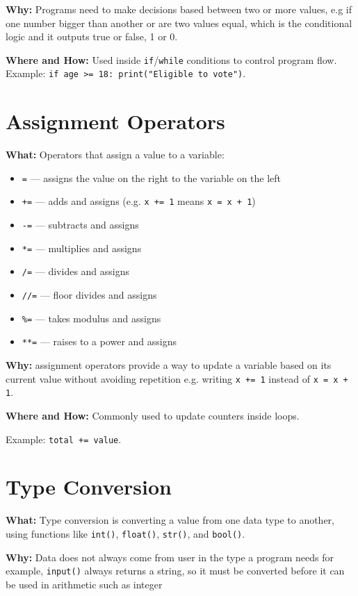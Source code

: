 \documentclass[11pt]{article}
\begin{document}
\textbf{Why:} Programs need to make decisions based between two or more values, e.g if 
one number bigger than another or are two values equal, which is the conditional logic and it outputs true or false, 1 or 0.

\textbf{Where and How:} Used inside \texttt{if}/\texttt{while} conditions to control program
flow.
Example: \texttt{if age >= 18: print("Eligible to vote")}.

\section{Assignment Operators}
\textbf{What:} Operators that assign a value to a variable:
\begin{itemize}[leftmargin=2em]
    \item \texttt{=} — assigns the value on the right to the variable on the left
    \item \texttt{+=} — adds and assigns (e.g. \texttt{x += 1} means \texttt{x = x + 1})
    \item \texttt{-=} — subtracts and assigns
    \item \texttt{*=} — multiplies and assigns
    \item \texttt{/=} — divides and assigns
    \item \texttt{//=} — floor divides and assigns
    \item \texttt{\%=} — takes modulus and assigns
    \item \texttt{**=} — raises to a power and assigns
\end{itemize}

\textbf{Why:} assignment operators provide a way to update a variable
based on its current value without avoiding repetition e.g. writing \texttt{x += 1} instead of
\texttt{x = x + 1}.

\textbf{Where and How:} Commonly used to update counters inside loops.

Example: \texttt{total += value}.

\section{Type Conversion}
\textbf{What:} Type conversion is converting a value from one
data type to another, using functions like \texttt{int()}, \texttt{float()}, \texttt{str()},
and \texttt{bool()}.

\textbf{Why:} Data does not always come from user in the type a program needs for example,
\texttt{input()} always returns a string, so it must be converted before it can be used in
arithmetic such as integer
\end{document}
